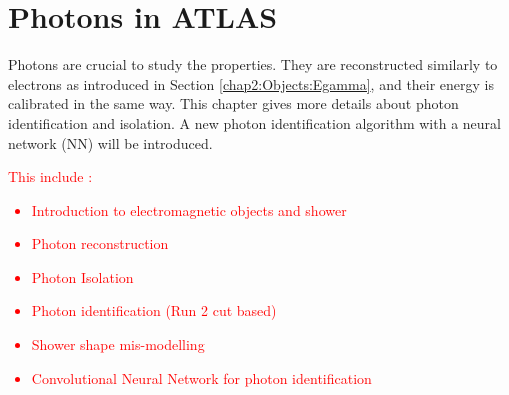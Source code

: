 \newpage
\chapter{Photons in ATLAS}
\label{gamma}
Photons are crucial to study the \HHyybb properties. They are reconstructed similarly to electrons as introduced in Section \ref{chap2:Objects:Egamma}, and their energy is calibrated in the same way. This chapter gives more details about photon identification and isolation. A new photon identification algorithm with a neural network (NN) will be introduced.  \\
\textcolor{red}{
This include :
\begin{itemize}
    \item Introduction to electromagnetic objects and shower 
    \item Photon reconstruction 
    \item Photon Isolation 
    \item Photon identification (Run 2 cut based)
    \item Shower shape mis-modelling 
    \item Convolutional Neural Network for photon identification
\end{itemize}
}
